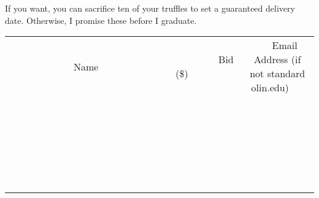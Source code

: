 \documentclass[11pt]{article}
\begin{document}
If you want, you can sacrifice ten of your truffles to set a guaranteed delivery date.  Otherwise, I promise these before I graduate.
\\[6ex]
\begin{tabular}{c c c}
~~~~~~~~~~~~~Name~~~~~~~~~~~~~ & ~~~~~~~~~Bid (\$)~~~~~~~~~  & ~~~Email Address (if not standard olin.edu)~~~\\
 & & \\
\hline
 & & \\
\hline
 & & \\
\hline
 & & \\
\hline
 & & \\
\hline
 & & \\
\hline
 & & \\
\hline
 & & \\
\hline
 & & \\
\hline
 & & \\
\hline
 & & \\
\hline
 & & \\
\hline
 & & \\
\hline
 & & \\
\hline
 & & \\
\hline
 & & \\
\hline
 & & \\
\hline
 & & \\
\hline
 & & \\
\hline
 & & \\
\hline
 & & \\
\hline
 & & \\
\hline
 & & \\
\hline
 & & \\
\hline
 & & \\
\hline
 & & \\
\hline
\end{tabular}
\newpage
\end{document}
